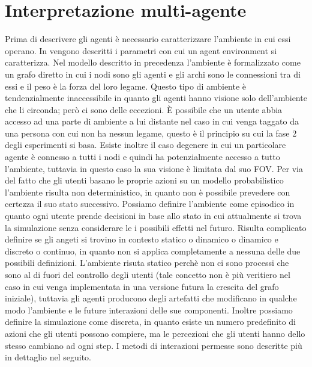\documentclass[a4paper,12pt]{article}
\begin{document}
\section{Interpretazione multi-agente}
\label{sec:mas}
Prima di descrivere gli agenti \`e necessario caratterizzare l'ambiente in cui essi operano. In \cite{norvig} vengono descritti i parametri con cui un agent environment si caratterizza.
Nel modello descritto in precedenza l'ambiente \`e formalizzato come un grafo diretto in cui i nodi sono gli agenti e gli archi sono le connessioni tra di essi e il peso \`e la forza del loro legame.
Questo tipo di ambiente \`e tendenzialmente inaccessibile in quanto gli agenti hanno visione solo dell'ambiente che li circonda; per\`o ci sono delle eccezioni. \`E possibile che un utente abbia accesso ad una parte di ambiente a lui distante nel caso in cui venga taggato da una persona con cui non ha nessun legame, questo \`e il principio su cui la fase 2 degli esperimenti si basa. Esiste inoltre il caso degenere in cui un particolare agente \`e connesso a tutti i nodi e quindi ha potenzialmente accesso a tutto l'ambiente, tuttavia in questo caso la sua visione \`e limitata dal suo FOV. Per via del fatto che gli utenti basano le proprie azioni su un modello probabilistico l'ambiente risulta non deterministico, in quanto non \`e possibile prevedere con certezza il suo stato successivo. Possiamo definire l'ambiente come episodico in quanto ogni utente prende decisioni in base allo stato in cui attualmente si trova la simulazione senza considerare le i possibili effetti nel futuro. Risulta complicato definire se gli angeti si trovino in contesto statico o dinamico o dinamico e discreto o continuo, in quanto non si applica completamente a nessuna delle due possibili definizioni. L'ambiente risuta statico perch\`e non ci sono processi che sono al di fuori del controllo degli utenti (tale concetto non \`e pi\`u veritiero nel caso in cui venga implementata in una versione futura la crescita del grafo iniziale), tuttavia gli agenti producono degli artefatti che modificano in qualche modo l'ambiente e le future interazioni delle sue componenti.
Inoltre possiamo definire la simulazione come discreta, in quanto esiste un numero predefinito di azioni che gli utenti possono compiere, ma le percezioni che gli utenti hanno dello stesso cambiano ad ogni step. I metodi di interazioni permesse sono descritte pi\`u in dettaglio nel seguito.
\end{document}
